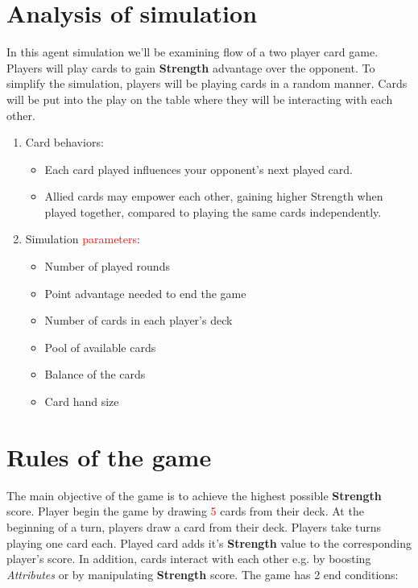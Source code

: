\documentclass[CCGS.tex]{subfiles}
\begin{document}
\maketitle

\clearpage

\section{Analysis of simulation}
In this agent simulation we'll be examining flow of a two player card game. Players will play cards to gain \textbf{Strength} advantage over the opponent. To simplify the simulation, players will be playing cards in a random manner. Cards will be put into the play on the table where they will be interacting with each other.

\begin{enumerate}
    \item Card behaviors:
    \begin{itemize}
        \item Each card played influences your opponent's next played card.
        \item Allied cards may empower each other, gaining higher Strength when played together, compared to playing the same cards independently.
    \end{itemize}
    \item Simulation \textcolor{red}{parameters}:
    \begin{itemize}
        \item Number of played rounds
        \item Point advantage needed to end the game
        \item Number of cards in each player's deck
        \item Pool of available cards
        \item Balance of the cards
        \item Card hand size
    \end{itemize}
\end{enumerate}

\section{Rules of the game}

    The main objective of the game is to achieve the highest possible \textbf{Strength} score. 
    Player begin the game by drawing \textcolor{red}{5} cards from their deck.
    At the beginning of a turn, players draw a card from their deck.
    Players take turns playing one card each.
    Played card adds it's \textbf{Strength} value to the corresponding player's score. 
    In addition, cards interact with each other e.g. by boosting \textit{Attributes} or by manipulating \textbf{Strength} score. 
    The game has 2 end conditions: 
    
\end{document}
